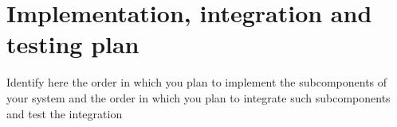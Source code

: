 \section{Implementation, integration and testing plan}
Identify here the order in which you plan to implement the subcomponents of your system and the order in which you plan to integrate such subcomponents and test the integration